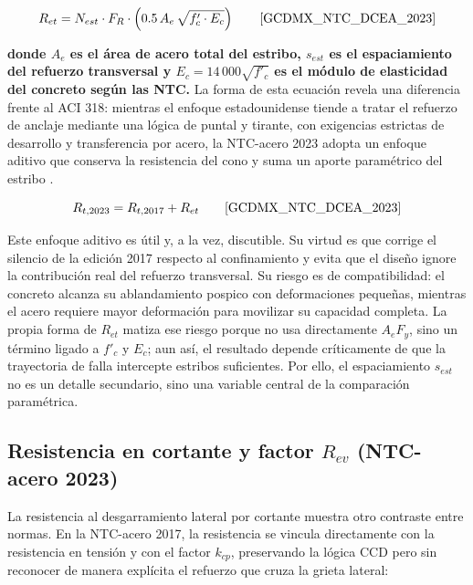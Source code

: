 \begin{equation}
  R_{et} = N_{est}\cdot F_R\cdot\left(0.5\,A_e\,\sqrt{f'_c\cdot E_c}\right)
  \qquad \text{\cite{GCDMX_NTC_DCEA_2023}}
  \label{eq:Ret}
\end{equation}

\noindent\textbf{donde $A_e$ es el área de acero total del estribo, $s_{est}$ es el espaciamiento del refuerzo transversal y $E_c=14\,000\sqrt{f'_c}$ es el módulo de elasticidad del concreto según las NTC.} La forma de esta ecuación revela una diferencia frente al ACI 318: mientras el enfoque estadounidense tiende a tratar el refuerzo de anclaje mediante una lógica de puntal y tirante, con exigencias estrictas de desarrollo y transferencia por acero, la NTC-acero 2023 adopta un enfoque aditivo que conserva la resistencia del cono y suma un aporte paramétrico del estribo \cite{ACI318_2019, ACI318_2025, GCDMX_NTC_DCEA_2023}.

\begingroup
\setlength{\abovedisplayskip}{4pt}
\setlength{\belowdisplayskip}{4pt}
\setlength{\abovedisplayshortskip}{2pt}
\setlength{\belowdisplayshortskip}{4pt}

\begin{equation}
  R_{t,2023} = R_{t,2017} + R_{et}
  \qquad \text{\cite{GCDMX_NTC_DCEA_2023}}
  \label{eq:Rt2023}
\end{equation}

Este enfoque aditivo es útil y, a la vez, discutible. Su virtud es que corrige el silencio de la edición 2017 respecto al confinamiento y evita que el diseño ignore la contribución real del refuerzo transversal. Su riesgo es de compatibilidad: el concreto alcanza su ablandamiento pospico con deformaciones pequeñas, mientras el acero requiere mayor deformación para movilizar su capacidad completa. La propia forma de $R_{et}$ matiza ese riesgo porque no usa directamente $A_eF_y$, sino un término ligado a $f'_c$ y $E_c$; aun así, el resultado depende críticamente de que la trayectoria de falla intercepte estribos suficientes. Por ello, el espaciamiento $s_{est}$ no es un detalle secundario, sino una variable central de la comparación paramétrica.

\subsection{Resistencia en cortante y factor \texorpdfstring{$R_{ev}$}{R\_ev} (NTC-acero 2023)}

La resistencia al desgarramiento lateral por cortante muestra otro contraste entre normas. En la NTC-acero 2017, la resistencia se vincula directamente con la resistencia en tensión y con el factor $k_{cp}$, preservando la lógica CCD pero sin reconocer de manera explícita el refuerzo que cruza la grieta lateral:

